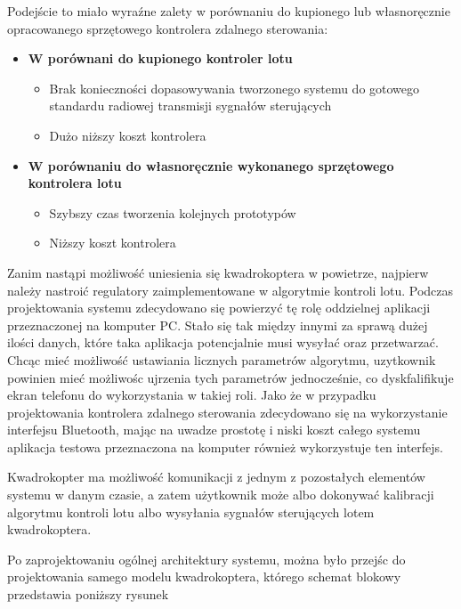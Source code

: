 Podejście to miało wyraźne zalety w porównaniu do kupionego lub własnoręcznie opracowanego sprzętowego kontrolera zdalnego sterowania:

\begin{itemize}
	\item \textbf{W porównani do kupionego kontroler lotu}
		\begin{itemize}
			\item Brak konieczności dopasowywania tworzonego systemu do gotowego standardu radiowej transmisji sygnałów sterujących
			\item Dużo niższy koszt kontrolera
		\end{itemize}
	\item \textbf{W porównaniu do własnoręcznie wykonanego sprzętowego kontrolera lotu}
		\begin{itemize}
			\item Szybszy czas tworzenia kolejnych prototypów
			\item Niższy koszt kontrolera
		\end{itemize}
\end{itemize}

Zanim nastąpi możliwość uniesienia się kwadrokoptera w powietrze, najpierw należy nastroić regulatory zaimplementowane w algorytmie kontroli lotu. Podczas projektowania systemu zdecydowano się powierzyć tę rolę oddzielnej aplikacji przeznaczonej na komputer PC. Stało się tak między innymi za sprawą dużej ilości danych, które taka aplikacja potencjalnie musi wysyłać oraz przetwarzać. Chcąc mieć możliwość ustawiania licznych parametrów algorytmu, uzytkownik powinien mieć możliwośc ujrzenia tych parametrów jednocześnie, co dyskfalifikuje ekran telefonu do wykorzystania w takiej roli. Jako że w przypadku projektowania kontrolera zdalnego sterowania zdecydowano się na wykorzystanie interfejsu Bluetooth, mając na uwadze prostotę i niski koszt całego systemu aplikacja testowa przeznaczona na komputer również wykorzystuje ten interfejs.

Kwadrokopter ma możliwość komunikacji z jednym z pozostałych elementów systemu w danym czasie, a zatem użytkownik może albo dokonywać kalibracji algorytmu kontroli lotu albo wysyłania sygnałów sterujących lotem kwadrokoptera.

Po zaprojektowaniu ogólnej architektury systemu, można było przejśc do projektowania samego modelu kwadrokoptera, którego schemat blokowy przedstawia poniższy rysunek

